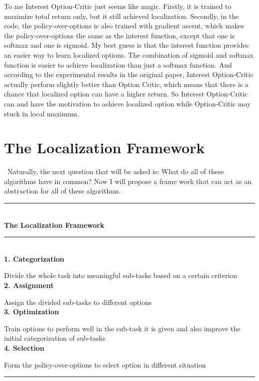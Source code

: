\documentclass{article}
\begin{document}
	\normalsize{\quad To me Interest Option-Critic just seems like magic. Firstly, it is trained to maximize total return only, but it still achieved localization. Secondly, in the code, the policy-over-options is also trained with gradient ascent, which makes the policy-over-options the same as the interest function, except that one is softmax and one is sigmoid. My best guess is that the interest function provides an easier way to learn localized options. The combination of sigmoid and softmax function is easier to achieve localization than just a softmax function. And according to the experimental results in the original paper, Interest Option-Critic actually perform slightly better than Option Critic, which means that there is a chance that localized option can have a higher return. So Interest Option-Critic can and have the motivation to achieve localized option while Option-Critic may stuck in local maximum.}
	\section{The Localization Framework}
	\qquad \ Naturally, the next question that will be asked is: What do all of these algorithms have in common? Now I will propose a frame work that can act as an abstraction for all of these algorithms.\vspace{0.1in}\\
	\rule{420pt}{2pt}\vspace{0.1in}\\
	\large{\bfseries{The Localization Framework}}\\
	\rule{420pt}{0.4pt}\\
	\normalsize{\bfseries{1. Categorization}}
	
	\normalsize{Divide the whole task into meaningful sub-tasks based on a certain criterion}\\
	{\bfseries{2. Assignment}}
	
	\normalsize{Assign the divided sub-tasks to different options}\\
	{\bfseries{3. Optimization}}
	
	\normalsize{Train options to perform well in the sub-task it is given and also improve the initial categorization of sub-tasks}\\
	{\bfseries{4. Selection}}
	
	\normalsize{Form the policy-over-options to select option in different situation}\\
	\rule{420pt}{1pt}\vspace{0.1in}
	
\end{document}
